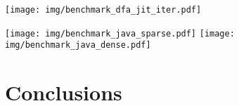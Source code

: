 \documentclass[]{article}
\begin{document}
\texttt{[image: img/benchmark\_dfa\_jit\_iter.pdf]}
\label{fig:benchmark_dfa_jit_iter}
\medskip

\pagebreak

\texttt{[image: img/benchmark\_java\_sparse.pdf]}
\medskip
\texttt{[image: img/benchmark\_java\_dense.pdf]}
\label{fig:benchmark_java}
\medskip

\section{Conclusions}\label{section_conclusions}


\pagebreak
\end{document}
